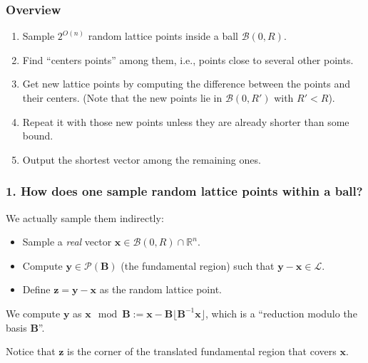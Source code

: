 \documentclass[aspectratio=43]{beamer}
\newcommand{\ball}[1]{\mathcal{B}(0, #1)}
\let\vec\mathbf %
\theoremstyle{remark}
\begin{document}
\begin{frame}
\frametitle{Overview}

\begin{enumerate}
\item Sample $2^{O(n)}$ random lattice points inside a ball 
$\ball{R}$.

\item Find ``centers points'' among them, i.e., points close to several other 
points.

\item Get new lattice points by computing the difference between the points and 
their centers. (Note that the new points lie in $\ball{R'}$ with $R' < R$).

\item Repeat it with those new points unless they are already shorter than some 
bound.

\item Output the shortest vector among the remaining ones.
\end{enumerate}
\end{frame}

\begin{frame}
\frametitle{1. How does one sample random lattice points within a ball?}

We actually sample them indirectly:
\begin{itemize}
\item Sample a \emph{real} vector $\vec x \in \ball{R} \cap \mathbb{R}^n$.
\item Compute $\vec y \in \mathcal{P}(\vec B)$ (the fundamental region)  such 
that $\vec y - \vec x \in \mathcal{L}$.
\item Define $\vec z = \vec y - \vec x$ as the random lattice point.
\end{itemize}

\vspace*{0.25cm}
We compute $\vec y$ as $\vec x \mod \vec B :=  \mathbf{x} - \mathbf{B} 
\lfloor\mathbf{B}^{-1} \mathbf{x} \rfloor$, which is a ``reduction modulo the 
basis $\vec B$''.

\vspace*{0.25cm}
Notice that $\vec z$ is the corner of the translated fundamental region that 
covers $\vec x$.

\end{frame}
\end{document}

